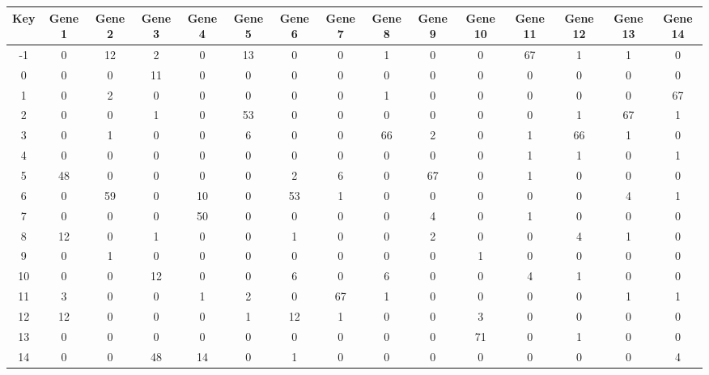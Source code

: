 \begin{tabular}{|c|c|c|c|c|c|c|c|c|c|c|c|c|c|c|}
\hline
Key & Gene 1 & Gene 2 & Gene 3 & Gene 4 & Gene 5 & Gene 6 & Gene 7 & Gene 8 & Gene 9 & Gene 10 & Gene 11 & Gene 12 & Gene 13 & Gene 14 \\
\hline
-1 & 0 & 12 & 2 & 0 & 13 & 0 & 0 & 1 & 0 & 0 & 67 & 1 & 1 & 0 \\
0 & 0 & 0 & 11 & 0 & 0 & 0 & 0 & 0 & 0 & 0 & 0 & 0 & 0 & 0 \\
1 & 0 & 2 & 0 & 0 & 0 & 0 & 0 & 1 & 0 & 0 & 0 & 0 & 0 & 67 \\
2 & 0 & 0 & 1 & 0 & 53 & 0 & 0 & 0 & 0 & 0 & 0 & 1 & 67 & 1 \\
3 & 0 & 1 & 0 & 0 & 6 & 0 & 0 & 66 & 2 & 0 & 1 & 66 & 1 & 0 \\
4 & 0 & 0 & 0 & 0 & 0 & 0 & 0 & 0 & 0 & 0 & 1 & 1 & 0 & 1 \\
5 & 48 & 0 & 0 & 0 & 0 & 2 & 6 & 0 & 67 & 0 & 1 & 0 & 0 & 0 \\
6 & 0 & 59 & 0 & 10 & 0 & 53 & 1 & 0 & 0 & 0 & 0 & 0 & 4 & 1 \\
7 & 0 & 0 & 0 & 50 & 0 & 0 & 0 & 0 & 4 & 0 & 1 & 0 & 0 & 0 \\
8 & 12 & 0 & 1 & 0 & 0 & 1 & 0 & 0 & 2 & 0 & 0 & 4 & 1 & 0 \\
9 & 0 & 1 & 0 & 0 & 0 & 0 & 0 & 0 & 0 & 1 & 0 & 0 & 0 & 0 \\
10 & 0 & 0 & 12 & 0 & 0 & 6 & 0 & 6 & 0 & 0 & 4 & 1 & 0 & 0 \\
11 & 3 & 0 & 0 & 1 & 2 & 0 & 67 & 1 & 0 & 0 & 0 & 0 & 1 & 1 \\
12 & 12 & 0 & 0 & 0 & 1 & 12 & 1 & 0 & 0 & 3 & 0 & 0 & 0 & 0 \\
13 & 0 & 0 & 0 & 0 & 0 & 0 & 0 & 0 & 0 & 71 & 0 & 1 & 0 & 0 \\
14 & 0 & 0 & 48 & 14 & 0 & 1 & 0 & 0 & 0 & 0 & 0 & 0 & 0 & 4 \\
\hline
\end{tabular}